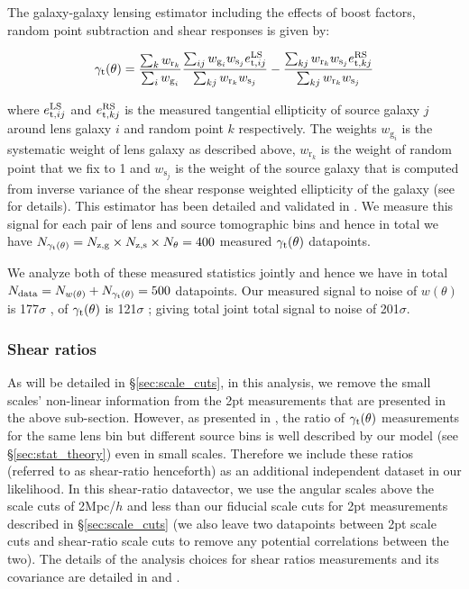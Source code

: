 \documentclass[fleqn,usenatbib]{mnras}
\newcommand{\gammat}{\ensuremath{\gamma_{\rm t}(\theta)}}
\newcommand{\wtheta}{\ensuremath{w(\theta)}}
\begin{document}
The galaxy-galaxy lensing estimator including the effects of boost factors, random point subtraction and shear responses is given by:
\begin{linenomath*}
\begin{equation}
    \gamma_{\rm t}(\theta) = \frac{\sum_k w_{\textrm{r}_k}}{\sum_i w_{\textrm{g}_i}} \frac{\sum_{ij} w_{\textrm{g}_i} w_{\textrm{s}_j} e^{\rm LS}_{{\rm t},ij}}{\sum_{kj} w_{\textrm{r}_k} w_{\textrm{s}_j}} - \frac{\sum_{kj} w_{\textrm{r}_k} w_{\textrm{s}_j} e^{\rm RS}_{{\rm t},kj}}{\sum_{kj} w_{\textrm{r}_k} w_{\textrm{s}_j}}
\end{equation}
\end{linenomath*}
where $e^{\rm LS}_{{\rm t},ij}$ and $e^{\rm RS}_{{\rm t},kj}$ is the measured tangential ellipticity of source galaxy $j$ around lens galaxy $i$ and random point $k$ respectively. The weights $w_{\textrm{g}_i}$ is the systematic weight of lens galaxy as described above, $w_{\textrm{r}_k}$ is the weight of random point that we fix to 1 and $w_{\textrm{s}_j}$ is the weight of the source galaxy that is computed from inverse variance of the shear response weighted ellipticity of the galaxy (see \cite{y3-shapecatalog} for details). This estimator has been detailed and validated in \cite{y3-gglensing}. We measure this signal for each pair of lens and source tomographic bins and hence in total we have  $N_{\gammat} = N_{\rm z,g} \times N_{\rm z,s} \times N_{\theta} = 400$ measured $\gammat$ datapoints. 

We analyze both of these measured statistics jointly and hence we have in total $N_{\rm data} = N_{\wtheta} + N_{\gammat} = 500$ datapoints. Our measured signal to noise of $\wtheta$ is 177$\sigma$ \citep{y3-galaxyclustering}, of  $\gammat$ is 121$\sigma$ \citep{y3-gglensing}; giving total joint total signal to noise of 201$\sigma$. 

\subsubsection{Shear ratios}\label{sec:shear_ratio}
As will be detailed in \S\ref{sec:scale_cuts}, in this analysis, we remove the small scales' non-linear information from the 2pt measurements that are presented in the above sub-section. However, as presented in \citet{y3-shearratio}, the ratio of $\gammat$ measurements for the same lens bin but different source bins is well described by our model (see \S\ref{sec:stat_theory}) even in small scales. Therefore we include these ratios (referred to as shear-ratio henceforth) as an additional independent dataset in our likelihood. In this shear-ratio datavector, we use the angular scales above the scale cuts of 2Mpc/$h$ and less than our fiducial scale cuts for 2pt measurements described in \S\ref{sec:scale_cuts} (we also leave two datapoints between 2pt scale cuts and shear-ratio scale cuts to remove any potential correlations between the two). The details of the analysis choices for shear ratios measurements and its covariance are detailed in \citet{y3-shearratio} and \citet{y3-3x2ptkp}. 
\end{document}
